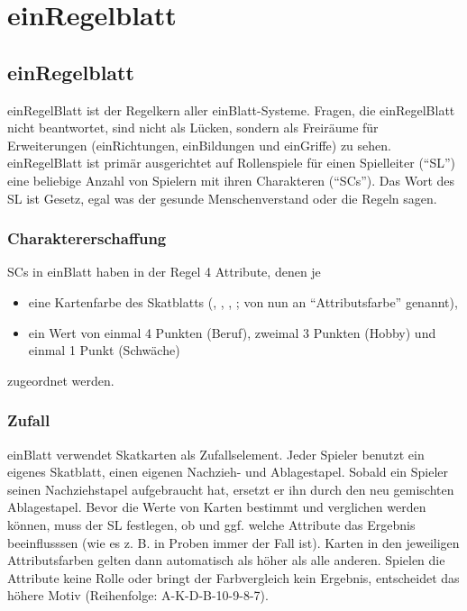 \part {einRegelblatt}
\chapter {einRegelblatt}
einRegelBlatt ist der Regelkern aller einBlatt-Systeme. Fragen, die einRegelBlatt nicht beantwortet, sind nicht als Lücken, sondern als Freiräume für Erweiterungen (einRichtungen, einBildungen und einGriffe) zu sehen. einRegelBlatt ist primär ausgerichtet auf Rollenspiele für einen Spielleiter ("`SL"') eine beliebige Anzahl von Spielern mit ihren Charakteren ("`SCs"'). Das Wort des SL ist Gesetz, egal was der gesunde Menschenverstand oder die Regeln sagen.
\section{Charaktererschaffung}
SCs in einBlatt haben in der Regel 4 Attribute, denen je
\begin{itemize}
\item eine Kartenfarbe des Skatblatts (\kreuz, \pik, \karo, \herz; von nun an "`Attributsfarbe"' genannt),
\item ein Wert von einmal 4 Punkten (Beruf), zweimal 3 Punkten (Hobby) und einmal 1 Punkt (Schwäche)
\end{itemize}
zugeordnet werden. 
\section{Zufall}
einBlatt verwendet Skatkarten als Zufallselement. Jeder Spieler benutzt ein eigenes Skatblatt, einen eigenen Nachzieh- und Ablagestapel. Sobald ein Spieler seinen Nachziehstapel aufgebraucht hat, ersetzt er ihn durch den neu gemischten Ablagestapel. Bevor die Werte von Karten bestimmt und verglichen werden können, muss der SL festlegen, ob und ggf. welche Attribute das Ergebnis beeinflusssen (wie es z. B. in Proben immer der Fall ist). Karten in den jeweiligen Attributsfarben gelten dann automatisch als höher als alle anderen. Spielen die Attribute keine Rolle oder bringt der Farbvergleich kein Ergebnis, entscheidet das höhere Motiv (Reihenfolge: A-K-D-B-10-9-8-7).
